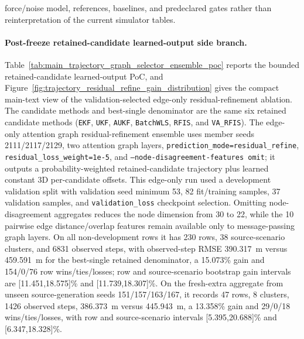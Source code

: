 \documentclass{article}
\begin{document}
force/noise model, references, baselines, and predeclared gates rather than reinterpretation of the current simulator tables.



\paragraph{Post-freeze retained-candidate learned-output side branch.}
Table~\ref{tab:main_trajectory_graph_selector_ensemble_poc} reports the bounded retained-candidate learned-output PoC, and Figure~\ref{fig:trajectory_residual_refine_gain_distribution} gives the compact main-text view of the validation-selected edge-only residual-refinement ablation. The candidate methods and best-single denominator are the same six retained candidate methods (\texttt{EKF}, \texttt{UKF}, \texttt{AUKF}, \texttt{BatchWLS}, \texttt{RFIS}, and \texttt{VA\_RFIS}). The edge-only attention graph residual-refinement ensemble uses member seeds 2111/2117/2129, two attention graph layers, \texttt{prediction\_mode=residual\_refine}, \texttt{residual\_loss\_weight=1e-5}, and \texttt{--node-disagreement-features omit}; it outputs a probability-weighted retained-candidate trajectory plus learned constant 3D per-candidate offsets. This edge-only run used a development validation split with validation seed minimum 53, 82 fit/training samples, 37 validation samples, and \texttt{validation\_loss} checkpoint selection. Omitting node-disagreement aggregates reduces the node dimension from 30 to 22, while the 10 pairwise edge distance/overlap features remain available only to message-passing graph layers. On all non-development rows it has 230 rows, 38 source-scenario clusters, and 6831 observed steps, with observed-step RMSE 390.317~m versus 459.591~m for the best-single retained denominator, a 15.073\% gain and 154/0/76 row wins/ties/losses; row and source-scenario bootstrap gain intervals are [11.451,18.575]\% and [11.739,18.307]\%. On the fresh-extra aggregate from unseen source-generation seeds 151/157/163/167, it records 47 rows, 8 clusters, 1426 observed steps, 386.373~m versus 445.943~m, a 13.358\% gain and 29/0/18 wins/ties/losses, with row and source-scenario intervals [5.395,20.688]\% and [6.347,18.328]\%.
\end{document}
